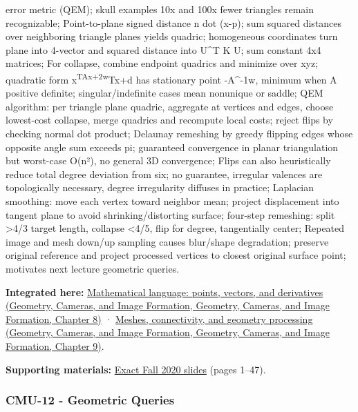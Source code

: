 error metric (QEM); skull examples 10x and 100x fewer triangles remain recognizable; Point-to-plane signed distance n dot (x-p); sum squared distances over neighboring triangle planes yields quadric; homogeneous coordinates turn plane into 4-vector and squared distance into U\^{}T K U; sum constant 4x4 matrices; For collapse, combine endpoint quadrics and minimize over xyz; quadratic form x\textsuperscript{TAx+2w}Tx+d has stationary point -A\^{}-1w, minimum when A positive definite; singular/indefinite cases mean nonunique or saddle; QEM algorithm: per triangle plane quadric, aggregate at vertices and edges, choose lowest-cost collapse, merge quadrics and recompute local costs; reject flips by checking normal dot product; Delaunay remeshing by greedy flipping edges whose opposite angle sum exceeds pi; guaranteed convergence in planar triangulation but worst-case O(n²), no general 3D convergence; Flips can also heuristically reduce total degree deviation from six; no guarantee, irregular valences are topologically necessary, degree irregularity diffuses in practice; Laplacian smoothing: move each vertex toward neighbor mean; project displacement into tangent plane to avoid shrinking/distorting surface; four-step remeshing: split \textgreater4/3 target length, collapse \textless4/5, flip for degree, tangentially center; Repeated image and mesh down/up sampling causes blur/shape degradation; preserve original reference and project processed vertices to closest original surface point; motivates next lecture geometric queries.

\textbf{Integrated here:} \href{../03-Geometry-Cameras-and-Image-Formation/main.pdf\#nameddest=03-visual-computing-i-ch001-mathematical-language-points-vectors-and-derivatives}{Mathematical language: points, vectors, and derivatives (Geometry, Cameras, and Image Formation, Geometry, Cameras, and Image Formation, Chapter 8)} · \href{../03-Geometry-Cameras-and-Image-Formation/main.pdf\#nameddest=03-visual-computing-i-ch002-meshes-connectivity-and-geometry-processing}{Meshes, connectivity, and geometry processing (Geometry, Cameras, and Image Formation, Geometry, Cameras, and Image Formation, Chapter 9)}.

\textbf{Supporting materials:} \href{https://15462.courses.cs.cmu.edu/fall2020content/lectures/11_geometryprocessing/11_geometryprocessing_slides.pdf}{Exact Fall 2020 slides} (pages 1--47).

\subsubsection{CMU-12 - Geometric Queries}\label{04-visual-computing-ii-ch036-cmu-12---geometric-queries}

